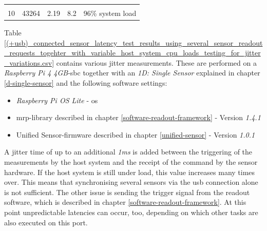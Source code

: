 \begin{longtable}[]{@{}lllll@{}}
\begin{minipage}[t]{0.10\columnwidth}
\strut
\end{minipage}\tabularnewline
\begin{minipage}[t]{0.08\columnwidth}\raggedright
10\strut
\end{minipage} & \begin{minipage}[t]{0.11\columnwidth}\raggedright
43264\strut
\end{minipage} & \begin{minipage}[t]{0.35\columnwidth}\raggedright
2.19\strut
\end{minipage} & \begin{minipage}[t]{0.22\columnwidth}\raggedright
8.2\strut
\end{minipage} & \begin{minipage}[t]{0.10\columnwidth}\raggedright
96\% system load\strut
\end{minipage}\tabularnewline
\bottomrule
\end{longtable}

Table
\ref{(+usb)_connected_sensor_latency_test_results_using_several_sensor_readout_requests_togehter_with_variable_host_system_cpu_loads_testing_for_jitter_variations.csv}
contains various jitter measurements. These are performed on a
\emph{Raspberry Pi 4 4GB}-\gls{sbc} together with an \emph{1D: Single
Sensor} explained in chapter \ref{d-single-sensor} and the following
software settings:

\begin{itemize}
\tightlist
\item
  \emph{Raspberry Pi OS Lite} - \gls{os}
\item
  \gls{mrp}-library described in chapter
  \ref{software-readout-framework} - Version \emph{1.4.1}
\item
  Unified Sensor-firmware described in chapter \ref{unified-sensor} -
  Version \emph{1.0.1}
\end{itemize}

A jitter time of up to an additional \emph{1ms} is added between the
triggering of the measurements by the host system and the receipt of the
command by the sensor hardware. If the host system is still under load,
this value increases many times over. This means that synchronising
several sensors via the \gls{usb} connection alone is not sufficient.
The other issue is sending the trigger signal from the readout software,
which is described in chapter \ref{software-readout-framework}. At this
point unpredictable latencies can occur, too, depending on which other
tasks are also executed on this port.

